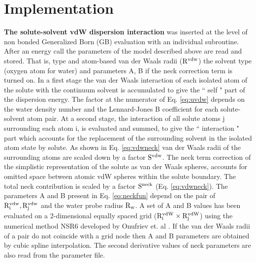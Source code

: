 \documentclass[12pt]{report}
\begin{document}
\section{Implementation}
\textbf{The solute-solvent vdW dispersion interaction} was inserted at the level of non bonded Generalized Born (GB) evaluation
with an individual subroutine. After an energy call the parameters of the model described above are read and stored. That is,
type and atom-based van der Waals radii ($\rm R^{vdw}$) the solvent type (oxygen atom for water) and parameters A, B if the neck
correction term is turned on. In a first stage the van der Waals interaction of each isolated atom of the solute with the continuum
solvent is accumulated to give the `` self " part of the dispersion energy. The factor at the numerator of Eq. \eqref{eq:uvdw}
depends on the water density number and the Lennard-Jones B coefficient for each solute-solvent atom pair. At a second stage,
the interaction of all solute atoms j surrounding each atom i, is evaluated and summed, to give the `` interaction " part which
accounts for the replacement of the surrounding solvent in the isolated atom state by solute. As shown in Eq. \eqref{eq:vdwneck}
van der Waals radii of the surrounding atoms are scaled down by a factor $\rm S^{vdw}$.  The neck term correction of the simplistic
representation of the solute as van der Waals spheres, accounts for omitted space between atomic vdW spheres within the solute
boundary. The total neck contribution is scaled by a factor $\rm S^{neck}$ (Eq. \ref{eq:vdwneck}).  The parameters A and B present
in Eq. \eqref{eq:neckfun} depend on the pair of $\rm R_i^{vdw}, R_j^{vdw}$ and the water probe radius $\rm R_w$. A set of A and B
values has been evaluated on a 2-dimensional equally spaced grid ($\rm R_i^{vdW}\times R_j^{vdW}$) using the numerical method NSR6
developed by Onufriev et. al \cite{Aguilar12}. If the van der Waals radii of a pair do not coincide with a grid node then A and B
parameters are obtained by cubic spline interpolation. The second derivative values of neck parameters are also read from the
parameter file. 
\end{document}
